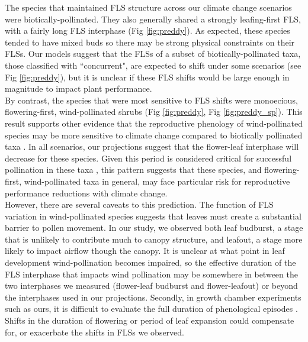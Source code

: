 \documentclass[12pt]{article}\usepackage[]{graphicx}\usepackage[]{color}
\begin{document}
\noindent The species that maintained FLS structure across our climate change scenarios were biotically-pollinated. They also generally shared a strongly leafing-first FLS, with a fairly long FLS interphase (Fig \ref{fig:preddy}). As expected, these species tended to have mixed buds so there may be strong physical constraints on their FLSs. Our models suggest that the FLSs of a subset of biotically-pollinated taxa, those classified with ``concurrent", are expected to shift under some scenarios (see Fig \ref{fig:preddy}), but  it is unclear if these FLS shifts would be large enough in magnitude to impact plant performance.\\

\noindent By contrast, the species that were most sensitive to FLS shifts were monoecious, flowering-first, wind-pollinated shrubs (Fig \ref{fig:preddy}, Fig \ref{fig:preddy_sp}). This result supports other evidence that the reproductive phenology of wind-pollinated species may be more sensitive to climate change compared to biotically pollinated taxa \citep{Ziello:2012aa}. In all scenarios, our projections suggest that the flower-leaf interphase will decrease for these species. Given this period is considered critical for successful pollination in these taxa \citep{Whitehead1969}, this pattern suggests that these species, and flowering-first, wind-pollinated taxa in general, may face particular risk for reproductive performance reductions with climate change.\\

\noindent However, there are several caveats to this prediction. The function of FLS variation in wind-pollinated species suggests that leaves must create a substantial barrier to pollen movement. In our study, we observed both leaf budburst, a stage that is unlikely to contribute much to canopy structure, and leafout, a stage more likely to impact airflow though the canopy. It is unclear at what point in leaf development wind-pollination becomes impaired, so the effective duration of the FLS interphase that impacts wind pollination may be somewhere in between the two interphases we measured (flower-leaf budburst and flower-leafout) or beyond the interphases used in our projections. Secondly, in growth chamber experiments such as ours, it is difficult to evaluate the full duration of phenological episodes \citep{Primack2015}. Shifts in the duration of flowering or period of leaf expansion could compensate for, or exacerbate the shifts in FLSs we observed.\\ 
\end{document}
